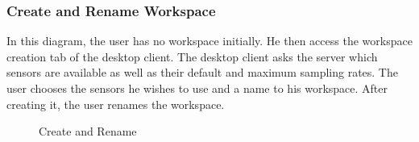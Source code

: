 \subsubsection{Create and Rename Workspace}
In this diagram, the user has no workspace initially. He then access the workspace creation tab of the desktop client. The desktop client asks the server which sensors are available as well as their default and maximum sampling rates. The user chooses the sensors he wishes to use and a name to his workspace. After creating it, the user renames the workspace.
\begin{figure}[!htb]
    \centering
    \caption{Create and Rename}
    \label{fig:seq-workspace-create-and-rename}
\end{figure}
\newpage

